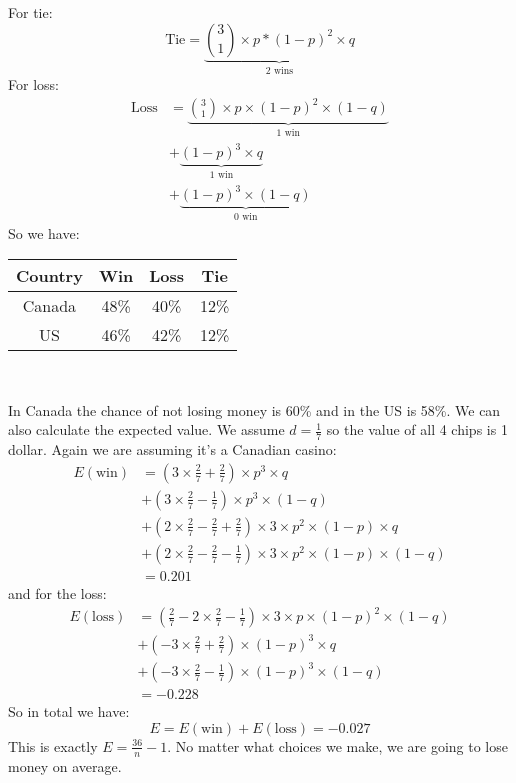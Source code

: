 \documentclass{book}
\begin{document}
	For tie:
	\begin{equation*}
		\text{Tie} = \underbrace{\binom{3}{1} \times p * (1 - p)^2 \times q}_\text{2 wins}
	\end{equation*}
	For loss:
	\begin{equation*}
		\begin{split}
			\text{Loss} &= \underbrace{\binom{3}{1} \times p \times (1 - p)^2 \times (1 - q)}_\text{1 win} \\
			&+ \underbrace{(1 - p)^3 \times q}_\text{1 win} \\
			&+ \underbrace{(1 - p)^3 \times (1 - q)}_\text{0 win}
		\end{split}
	\end{equation*}
	So we have: \\
	\par 
	\begin{tabular}[h!]{c c c c}
		\toprule
		Country & Win & Loss & Tie \\
		\midrule
		Canada & 48\% & 40\% & 12\% \\
		US & 46\% & 42\% & 12\% \\
		\bottomrule
	\end{tabular} \\
	\par In Canada the chance of not losing money is 60\% and in the US is 58\%. We can also calculate the expected value. We assume $d = \frac{1}{7}$ so the value of all 4 chips is 1 dollar. Again we are assuming it's a Canadian casino:
	\begin{equation*}
		\begin{split}
			E(\text{win}) &= (3 \times \frac{2}{7} + \frac{2}{7}) \times p^3 \times q \\
			&+ (3 \times \frac{2}{7} - \frac{1}{7}) \times p^3 \times (1 - q) \\
			&+ (2 \times \frac{2}{7} - \frac{2}{7} + \frac{2}{7}) \times 3 \times p^2 \times (1 - p) \times q \\
			&+ (2 \times \frac{2}{7} - \frac{2}{7} - \frac{1}{7}) \times 3 \times p^2 \times (1 - p) \times (1 - q) \\
			&= 0.201
		\end{split}
	\end{equation*}
	and for the loss:
	\begin{equation*}
		\begin{split}
			E(\text{loss}) &= (\frac{2}{7} - 2 \times \frac{2}{7} - \frac{1}{7}) \times 3 \times p \times (1 - p)^2 \times (1 - q) \\
			&+ (-3 \times \frac{2}{7} + \frac{2}{7}) \times (1 - p)^3 \times q \\
			&+ (-3 \times \frac{2}{7} - \frac{1}{7}) \times (1 - p)^3 \times (1 - q) \\
			&= -0.228
		\end{split}
	\end{equation*}
	So in total we have:
	\begin{equation*}
		E = E(\text{win}) + E(\text{loss}) = -0.027
	\end{equation*}
	This is exactly $E = \frac{36}{n} - 1$. No matter what choices we make, we are going to lose money on average.
\end{document}
